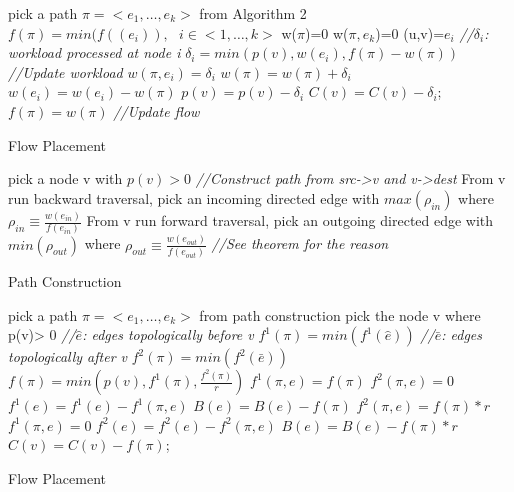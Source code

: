 \documentclass{sig-alternate}
\begin{document}
\begin{algorithm}\label {Flow Placement}
\SetAlgoLined
\BlankLine
{}
{

pick a path $\pi = <e_1, \dots, e_k> $ from Algorithm 2\;
 	$f(\pi) = min( f((e_i) ), \text{ } i\in <1,\dots,k>$\;
	\BlankLine
	w($\pi$)=0\;
	w($\pi, e_k$)=0\;
	\BlankLine
	{
	(u,v)=$e_i$\;
	\emph{//$\delta_i$: workload processed at node i}\;
	$\delta_i = min( p(v), w(e_{i}) , f(\pi) -w(\pi))$\;
	\emph{//Update workload}\;
	$w(\pi, e_i) =\delta_i$\;
	$ w(\pi)= w(\pi)+ \delta_i$\;
	$w(e_i) = w(e_i)- w(\pi)$\;
	$p(v) = p(v)-\delta_i$\;
	$C(v) = C(v) - \delta_i$;
	}
	\BlankLine
	$f(\pi) = w(\pi) $
	\BlankLine
	\emph{//Update flow}\;
	
}
\caption{Flow Placement}
\end{algorithm}

\begin{algorithm}\label {Path Construction}
\SetAlgoLined
\BlankLine
pick a node v with $p(v)>0$\;
\emph{//Construct path from src->v and v->dest}\;
From v run backward traversal, pick an incoming directed edge with $ max( \rho_{in} )  $ where $\rho_{in} \equiv \frac{ w(e_{in})}{f(e_{in})}$\;
From v run forward traversal, pick an outgoing directed edge with $ min(\rho_{out} ) $ where $\rho_{out} \equiv \frac{ w(e_{out})}{f(e_{out})} $\;
\emph{//See theorem for the reason}\;
\caption{ Path Construction}
\end{algorithm}

\begin{algorithm}\label {Flow Placement}
\SetAlgoLined
\BlankLine
{}
{

pick a path $\pi = <e_1, \dots, e_k> $ from path construction\;
	\BlankLine
	pick the node v where p(v)> 0\;
	\emph{//$\hat{e}$: edges topologically before v }\;
	$f^1 (\pi)= min(f^1(\hat{e}))$\;
	\emph{//$\bar{e}$: edges topologically after v }\;
	$f^2 (\pi)= min(f^2(\bar{e}))$\;
	$f(\pi) = min( p(v), f^1(\pi) , \frac {f^2(\pi)}{r} ) $\;
	{
	$f^1(\pi, e) = f(\pi)$\;
	$f^2(\pi, e) = 0$\;
	$f^1(e) = f^1(e) - f^1(\pi, e)$\;
	$B(e)=B(e)-f(\pi)$
	}
	{
	$f^2(\pi, e) = f(\pi)*r$\;
	$f^1(\pi, e) = 0$\;
	$f^2(e) = f^2(e) - f^2(\pi, e)$\;
	$B(e)=B(e)-f(\pi)*r$
	}
	$C(v) = C(v) - f(\pi)$;
}
\caption{Flow Placement}
\end{algorithm}
\end{document}
